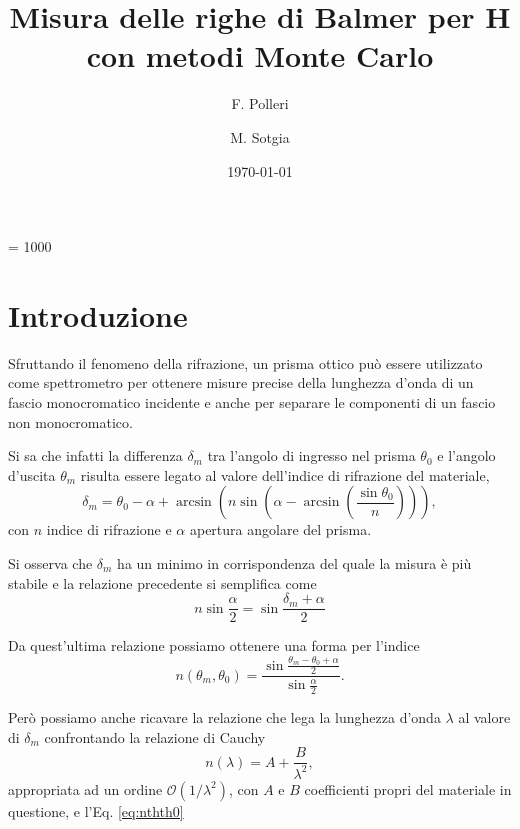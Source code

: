 \documentclass[a4paper,aps,12pt,tightenlines]{revtex4-2}
\begin{document}
\count\footins = 1000
\title{Misura delle righe di Balmer per H con metodi Monte Carlo}
\author{F. Polleri}
\author{M. Sotgia}
\date{\today}
\maketitle

\section{Introduzione}
Sfruttando il fenomeno della rifrazione, un prisma ottico può essere utilizzato come spettrometro per ottenere misure precise della lunghezza d'onda di un fascio monocromatico incidente e anche per separare le componenti di un fascio non monocromatico. 

Si sa che infatti la differenza $\delta_m$ tra l'angolo di ingresso nel prisma $\theta_0$ e l'angolo d'uscita $\theta_m$ risulta essere legato al valore dell'indice di rifrazione del materiale, \begin{equation}\delta_m = \theta_0 - \alpha+\arcsin\left(n\sin\left(\alpha - \arcsin\left(\frac{\sin\theta_0}{n}\right)\right)\right),\end{equation} con $n$ indice di rifrazione e $\alpha$ apertura angolare del prisma. 

Si osserva che $\delta_m$ ha un minimo in corrispondenza del quale la misura è più stabile e la relazione precedente si semplifica come \begin{equation} n\sin\frac{\alpha}{2} = \sin\frac{\delta_m + \alpha}{2} \end{equation}

Da quest'ultima relazione possiamo ottenere una forma per l'indice \begin{equation} n(\theta_m, \theta_0) = \frac{\sin\frac{\theta_m-\theta_0 + \alpha}{2}}{\sin\frac{\alpha}{2}}.\label{eq:nthth0}\end{equation}

Però possiamo anche ricavare la relazione che lega la lunghezza d'onda $\lambda$ al valore di $\delta_m$ confrontando la relazione di Cauchy \begin{equation} n(\lambda) = A + \frac{B}{\lambda^2},\end{equation} appropriata ad un ordine $\mathcal O (1/\lambda^2)$, con $A$ e $B$ coefficienti propri del materiale in questione, e l'Eq. \eqref{eq:nthth0}
\end{document}
